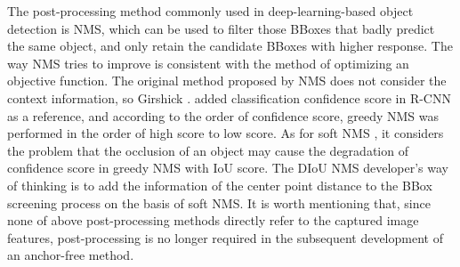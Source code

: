 \documentclass[10pt,twocolumn,letterpaper]{article}
\begin{document}
The post-processing method commonly used in deep-learning-based object detection is NMS, which can be used to filter those BBoxes that badly predict the same object, and only retain the candidate BBoxes with higher response. The way NMS tries to improve is consistent with the method of optimizing an objective function. The original method proposed by NMS does not consider the context information, so Girshick \etal. \cite{girshick2014rich} added classification confidence score in R-CNN as a reference, and according to the order of confidence score, greedy NMS was performed in the order of high score to low score. As for soft NMS \cite{bodla2017soft}, it considers the problem that the occlusion of an object may cause the degradation of confidence score in greedy NMS with IoU score. The DIoU NMS \cite{zheng2019distance} developer’s way of thinking is to add the information of the center point distance to the BBox screening process on the basis of soft NMS. It is worth mentioning that, since none of above post-processing methods directly refer to the captured image features, post-processing is no longer required in the subsequent development of an anchor-free method.

\end{document}

